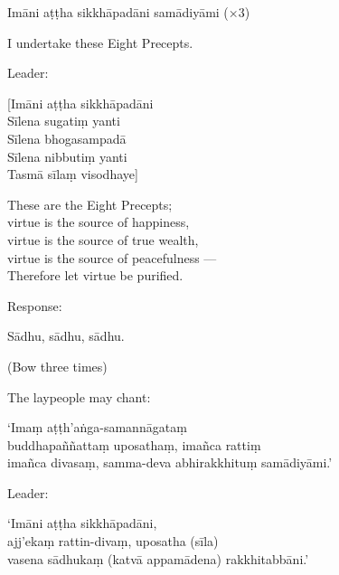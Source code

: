 Imāni aṭṭha sikkhāpadāni samādiyāmi (×3)

\begin{english}
  I undertake these Eight Precepts.
\end{english}

\begin{instruction}
  Leader:
\end{instruction}

\ifhandbookedition
\enlargethispage{\baselineskip}
\fi

[Imāni aṭṭha sikkhāpadāni\\
Sīlena sugatiṃ yanti\\
Sīlena bhogasampadā\\
Sīlena nibbutiṃ yanti\\
Tasmā sīlaṃ visodhaye]

\begin{english}
  These are the Eight Precepts;\\
  virtue is the source of happiness,\\
  virtue is the source of true wealth,\\
  virtue is the source of peacefulness ---\\
  Therefore let virtue be purified.
\end{english}

\begin{instruction}
  Response:
\end{instruction}

Sādhu, sādhu, sādhu.

\begin{instruction}
  (Bow three times)
\end{instruction}


\begin{instruction}
  The laypeople may chant:
\end{instruction}

‘Imaṃ aṭṭh'aṅga-samannāgataṃ\\
buddhapaññattaṃ uposathaṃ, imañca rattiṃ\\
imañca divasaṃ, samma-deva abhirakkhituṃ samādiyāmi.’

\begin{instruction}
  Leader:
\end{instruction}

‘Imāni aṭṭha sikkhāpadāni,\\
ajj'ekaṃ rattin-divaṃ, uposatha (sīla)\\
vasena sādhukaṃ (katvā appamādena) rakkhitabbāni.’


